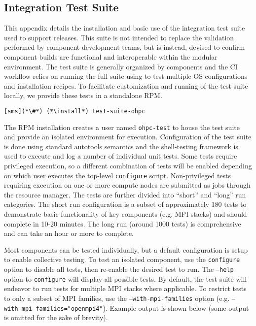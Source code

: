 \clearpage
\subsection{Integration Test Suite}  \label{appendix:test_suite}

This appendix details the installation and basic use of the integration test
suite used to support \OHPC{} releases. This suite is not intended to replace
the validation performed by component development teams, but is instead,
devised to confirm component builds are functional and interoperable within
the modular \OHPC{} environment.
The test suite is generally organized by components and the \OHPC{} CI workflow
relies on running the full suite using \href{https://jenkins.io}{\color{blue}{Jenkins}} to test
multiple OS configurations and installation recipes.
To facilitate customization and running of the test suite locally, we
provide these tests in a standalone RPM.

\begin{lstlisting}
[sms](*\#*) (*\install*) test-suite-ohpc
\end{lstlisting}

The RPM installation creates a user named \texttt{ohpc-test} to house the test
suite and provide an isolated environment for execution.  Configuration of the
test suite is done using standard \GNU{} autotools semantics and the
\href{https://jenkins.io}{\color{blue}{BATS}} shell-testing framework is used
to execute and log a number of individual unit tests.  Some tests require
privileged execution, so a different combination of tests will be enabled
depending on which user executes the top-level \texttt{configure}
script. Non-privileged tests requiring execution on one or more compute nodes are
submitted as jobs through the \rms{} resource manager. The tests are further
divided into ``short'' and ``long'' run categories. The short run configuration
is a subset
of approximately 180 tests to demonstrate basic functionality of key components
(e.g. MPI stacks) and should complete in 10-20 minutes. The long run (around
1000 tests) is comprehensive and can take an hour or more to complete.

Most components can be tested individually, but a default configuration is
setup to enable collective testing. To test an isolated component, use the
\texttt{configure} option to disable all tests, then re-enable the desired test
to run. The \texttt{--help} option to \texttt{configure} will display all
possible tests. By default, the test suite will endeavor to run tests for
multiple MPI stacks where applicable. To restrict tests to only a subset of MPI
families, use the \texttt{--with-mpi-families} option
(e.g. \texttt{--with-mpi-families="openmpi4"}). Example output is shown below
(some output is omitted for the sake of brevity).

